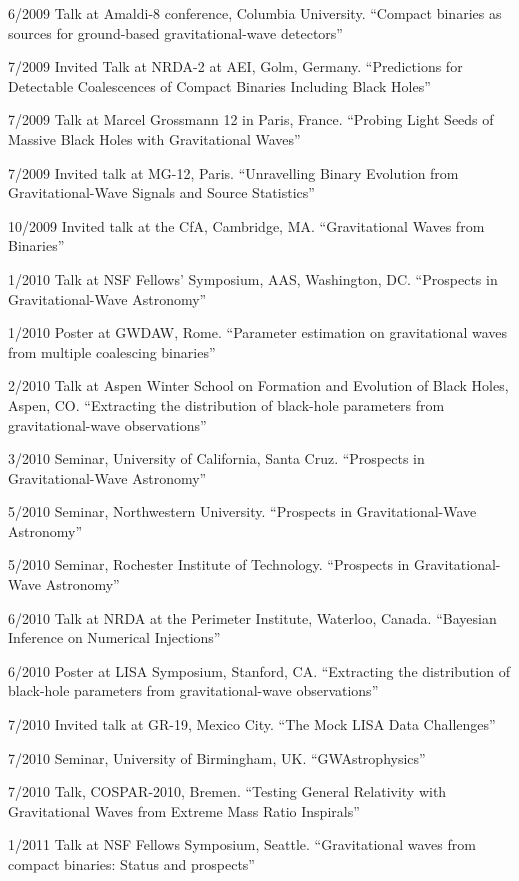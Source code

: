 \documentclass[margin,line]{res}
\begin{document}
\begin{resume}
6/2009	Talk at Amaldi-8 conference, Columbia University. ``Compact binaries as sources for ground-based gravitational-wave detectors''

7/2009	Invited Talk at NRDA-2 at AEI, Golm, Germany. ``Predictions for Detectable Coalescences of Compact Binaries Including Black Holes''

7/2009	Talk at Marcel Grossmann 12 in Paris, France.  ``Probing Light Seeds of Massive Black Holes with Gravitational Waves'' 

7/2009	Invited talk at MG-12, Paris.  ``Unravelling Binary Evolution from Gravitational-Wave Signals and Source Statistics''

10/2009	Invited talk at the CfA, Cambridge, MA.  ``Gravitational Waves from Binaries''

1/2010	Talk at NSF Fellows' Symposium, AAS, Washington, DC. ``Prospects in Gravitational-Wave Astronomy''

1/2010	Poster at GWDAW, Rome.  ``Parameter estimation on gravitational waves from multiple coalescing binaries''

2/2010	Talk at Aspen Winter School on Formation and Evolution of Black Holes, Aspen, CO.  ``Extracting the distribution of black-hole parameters from gravitational-wave observations''

3/2010	Seminar, University of California, Santa Cruz. ``Prospects in Gravitational-Wave Astronomy''

5/2010	Seminar, Northwestern University. ``Prospects in Gravitational-Wave Astronomy''

5/2010	Seminar, Rochester Institute of Technology. ``Prospects in Gravitational-Wave Astronomy''

6/2010	Talk at NRDA at the Perimeter Institute, Waterloo, Canada. ``Bayesian Inference on Numerical Injections''

6/2010	Poster at LISA Symposium, Stanford, CA.  ``Extracting the distribution of black-hole parameters from gravitational-wave observations''

7/2010	Invited talk at GR-19, Mexico City.  ``The Mock LISA Data Challenges''

7/2010	Seminar, University of Birmingham, UK.  ``GWAstrophysics''

7/2010	Talk, COSPAR-2010, Bremen.  ``Testing General Relativity with Gravitational Waves from Extreme Mass Ratio Inspirals''

1/2011 	Talk at NSF Fellows Symposium, Seattle. 	``Gravitational waves from compact binaries: Status and prospects''


\end{resume}
\end{document}
